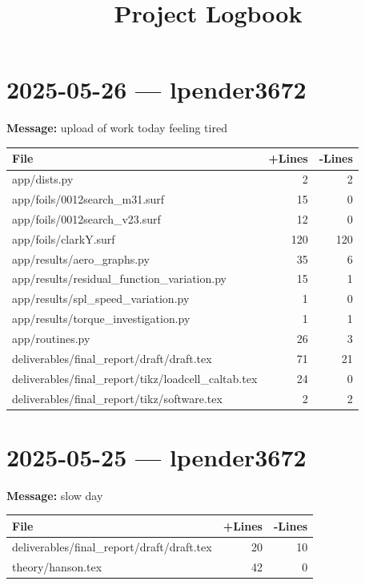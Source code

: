 \documentclass{article}
\title{Project Logbook}
\date{}
\begin{document}
\maketitle

\section*{2025-05-26 --- lpender3672}
\textbf{Message:} upload of work today feeling tired

\begin{longtable}{|p{10cm}|r|r|}
\hline \textbf{File} & \textbf{+Lines} & \textbf{-Lines} \\
\hline
app/dists.py & 2 & 2 \\
\hline
app/foils/0012search\_m31.surf & 15 & 0 \\
\hline
app/foils/0012search\_v23.surf & 12 & 0 \\
\hline
app/foils/clarkY.surf & 120 & 120 \\
\hline
app/results/aero\_graphs.py & 35 & 6 \\
\hline
app/results/residual\_function\_variation.py & 15 & 1 \\
\hline
app/results/spl\_speed\_variation.py & 1 & 0 \\
\hline
app/results/torque\_investigation.py & 1 & 1 \\
\hline
app/routines.py & 26 & 3 \\
\hline
deliverables/final\_report/draft/draft.tex & 71 & 21 \\
\hline
deliverables/final\_report/tikz/loadcell\_caltab.tex & 24 & 0 \\
\hline
deliverables/final\_report/tikz/software.tex & 2 & 2 \\
\hline
\end{longtable}

\section*{2025-05-25 --- lpender3672}
\textbf{Message:} slow day

\begin{longtable}{|p{10cm}|r|r|}
\hline \textbf{File} & \textbf{+Lines} & \textbf{-Lines} \\
\hline
deliverables/final\_report/draft/draft.tex & 20 & 10 \\
\hline
theory/hanson.tex & 42 & 0 \\
\hline
\end{longtable}
\end{document}
